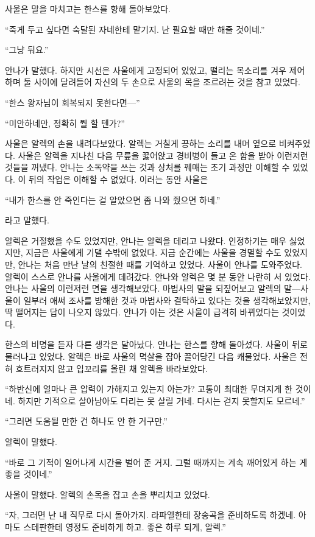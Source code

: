 사울은 말을 마치고는 한스를 향해 돌아보았다.

``죽게 두고 싶다면 숙달된 자네한테 맡기지. 난 필요할 때만 해줄 것이네.''

``그냥 둬요.''

안나가 말했다. 하지만 시선은 사울에게 고정되어 있었고, 떨리는 목소리를 겨우 제어하며 둘 사이에 달려들어 자신의 두 손으로 사울의 목을 조르려는 것을 참고 있었다.

``한스 왕자님이 회복되지 못한다면—''

``미안하네만, 정확히 뭘 할 텐가?''

사울은 알렉의 손을 내려다보았다. 알렉는 거칠게 끙하는 소리를 내며 옆으로 비켜주었다. 사울은 알렉을 지나친 다음 무릎을 꿇어앉고 경비병이 들고 온 함을 받아 이런저런 것들을 꺼냈다. 안나는 소독약을 쓰는 것과 상처를 꿰매는 초기 과정만 이해할 수 있었다. 이 뒤의 작업은 이해할 수 없었다.  이러는 동안 사울은

``내가 한스를 안 죽인다는 걸 알았으면 좀 나와 줬으면 하네.''

라고 말했다.

알렉은 거절했을 수도 있었지만, 안나는 알렉을 데리고 나왔다. 인정하기는 매우 싫었지만, 지금은 사울에게 기댈 수밖에 없었다. 지금 순간에는 사울을 경멸할 수도 있었지만, 안나는 처음 만난 날의 친절한 때를 기억하고 있었다. 사울이 안나를 도와주었다. 알렉이 스스로 안나를 사울에게 데려갔다. 안나와 알렉은 몇 분 동안 나란히 서 있었다. 안나는 사울의 이런저런 면을 생각해보았다. 마법사의 말을 되짚어보고 알렉의 말—사울이 일부러 애써 조사를 방해한 것과 마법사와 결탁하고 있다는 것을 생각해보았지만, 딱 떨어지는 답이 나오지 않았다. 안나가 아는 것은 사울이 급격히 바뀌었다는 것이었다.

한스의 비명을 듣자 다른 생각은 달아났다. 안나는 한스를 향해 돌아섰다. 사울이 뒤로 물러나고 있었다. 알렉은 바로 사울의 멱살을 잡아 끌어당긴 다음 캐물었다. 사울은 전혀 흐트러지지 않고 입꼬리를 올린 채 알렉을 바라보았다.

``하반신에 얼마나 큰 압력이 가해지고 있는지 아는가? 고통이 최대한 무뎌지게 한 것이네. 하지만 기적으로 살아남아도 다리는 못 살릴 거네. 다시는 걷지 못할지도 모르네.''

``그러면 도움될 만한 건 하나도 안 한 거구만.''

알렉이 말했다.

``바로 그 기적이 일어나게 시간을 벌어 준 거지. 그럴 때까지는 계속 깨어있게 하는 게 좋을 것이네.''

사울이 말했다. 알렉의 손목을 잡고 손을 뿌리치고 있었다.

``자, 그러면 난 내 직무로 다시 돌아가지. 라파엘한테 장송곡을 준비하도록 하겠네. 아마도 스테판한테 영정도 준비하게 하고. 좋은 하루 되게, 알렉.''

